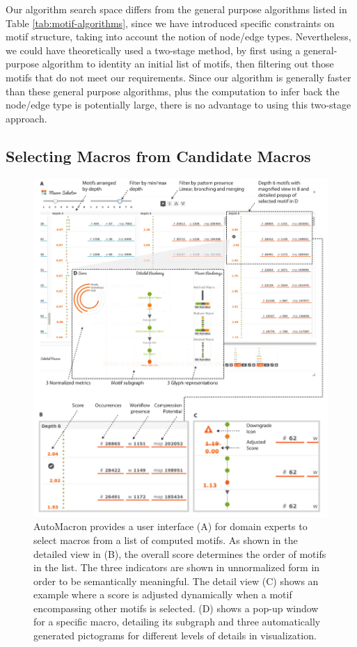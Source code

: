 Our algorithm search space differs from the general purpose algorithms listed in Table \ref{tab:motif-algorithms}, since we have introduced specific constraints on motif structure, taking into account the notion of node/edge types.
Nevertheless, we could have theoretically used a two-stage method, by first using a general-purpose algorithm to identity an initial list of motifs, then filtering out those motifs that do not meet our requirements.
Since our algorithm is generally faster than these general purpose algorithms, plus the computation to infer back the node/edge type is potentially large, there is no advantage to using this two-stage approach.


\subsection{Selecting Macros from Candidate Macros}
\label{sec:Selection}

\begin{figure}[t!]
\centering
\includegraphics[width=\textwidth]{images/automacron/motif-selection-09}
\caption{AutoMacron provides a user interface (A) for domain experts to select macros from a list of computed motifs.
As shown in the detailed view in (B), the overall score determines the order of motifs in the list.
The three indicators are shown in unnormalized form in order to be semantically meaningful.
The detail view (C) shows an example where a score is adjusted dynamically when a motif encompassing other motifs is selected.
(D) shows a pop-up window for a specific macro, detailing its subgraph and three automatically generated pictograms for different levels of details in visualization.}
\label{fig:motif-selection}
\end{figure}

